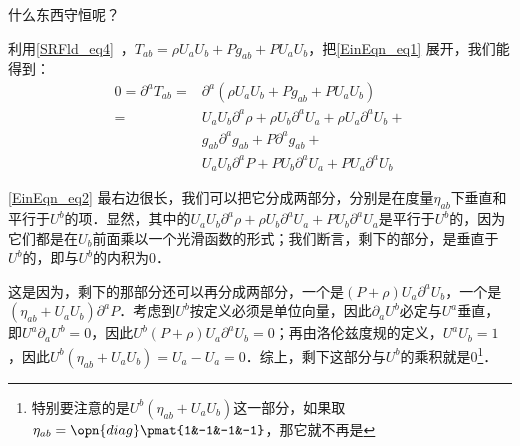 什么东西守恒呢？

利用\autoref{SRFld_eq4}~，$T_{ab}=\rho U_aU_b+P g_{ab}+P U_aU_b$，把\autoref{EinEqn_eq1} 展开，我们能得到：
\begin{equation}\label{EinEqn_eq2}
\begin{aligned}
0=\partial^aT_{ab}=&\partial^a(\rho U_aU_b+P g_{ab}+P U_aU_b)\\
=&U_aU_b\partial^a\rho+\rho U_b\partial^aU_a+\rho U_a\partial^aU_b+\\
&g_{ab}\partial^ag_{ab}+P\partial^ag_{ab}+\\
&U_aU_b\partial^aP+P U_b\partial^aU_a+P U_a\partial^aU_b
\end{aligned}
\end{equation}

\autoref{EinEqn_eq2} 最右边很长，我们可以把它分成两部分，分别是在度量$\eta_{ab}$下垂直和平行于$U^b$的项．显然，其中的$U_aU_b\partial^a\rho+\rho U_b\partial^aU_a+P U_b\partial^aU_a$是平行于$U^b$的，因为它们都是在$U_b$前面乘以一个光滑函数的形式；我们断言，剩下的部分，是垂直于$U^b$的，即与$U^b$的内积为$0$．

这是因为，剩下的那部分还可以再分成两部分，一个是$(P+\rho)U_a\partial^aU_b$，一个是$(\eta_{ab}+U_aU_b)\partial^aP$．考虑到$U^b$按定义必须是单位向量，因此$\partial_aU^b$必定与$U^a$垂直，即$U^a\partial_aU^b=0$，因此$U^b(P+\rho)U_a\partial^aU_b=0$；再由洛伦兹度规的定义，$U^aU_b=1$，因此$U^b(\eta_{ab}+U_aU_b)=U_a-U_a=0$．综上，剩下这部分与$U^b$的乘积就是$0$\footnote{特别要注意的是$U^b(\eta_{ab}+U_aU_b)$这一部分，如果取$\eta_{ab}=\opn{diag}\pmat{1&-1&-1&-1}$，那它就不再是}．













